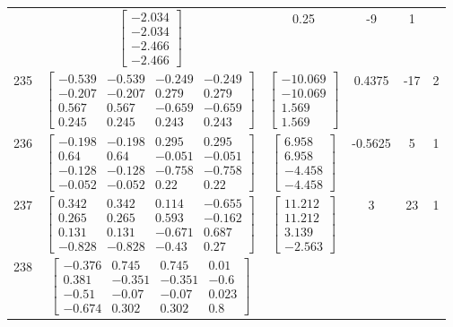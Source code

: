\documentclass[a4paper,12pt]{article}
\begin{document}
\begin{tabular}{c c c c c c}
&
$\begin{bmatrix} -2.034 \\ -2.034 \\ -2.466 \\ -2.466 \end{bmatrix}$
&
0.25
&
-9
&
1
\\
235
&
$\begin{bmatrix} -0.539 & -0.539 & -0.249 & -0.249 \\ -0.207 & -0.207 & 0.279 & 0.279 \\ 0.567 & 0.567 & -0.659 & -0.659 \\ 0.245 & 0.245 & 0.243 & 0.243 \end{bmatrix}$
&
$\begin{bmatrix} -10.069 \\ -10.069 \\ 1.569 \\ 1.569 \end{bmatrix}$
&
0.4375
&
-17
&
2
\\
236
&
$\begin{bmatrix} -0.198 & -0.198 & 0.295 & 0.295 \\ 0.64 & 0.64 & -0.051 & -0.051 \\ -0.128 & -0.128 & -0.758 & -0.758 \\ -0.052 & -0.052 & 0.22 & 0.22 \end{bmatrix}$
&
$\begin{bmatrix} 6.958 \\ 6.958 \\ -4.458 \\ -4.458 \end{bmatrix}$
&
-0.5625
&
5
&
1
\\
237
&
$\begin{bmatrix} 0.342 & 0.342 & 0.114 & -0.655 \\ 0.265 & 0.265 & 0.593 & -0.162 \\ 0.131 & 0.131 & -0.671 & 0.687 \\ -0.828 & -0.828 & -0.43 & 0.27 \end{bmatrix}$
&
$\begin{bmatrix} 11.212 \\ 11.212 \\ 3.139 \\ -2.563 \end{bmatrix}$
&
3
&
23
&
1
\\
238
&
$\begin{bmatrix} -0.376 & 0.745 & 0.745 & 0.01 \\ 0.381 & -0.351 & -0.351 & -0.6 \\ -0.51 & -0.07 & -0.07 & 0.023 \\ -0.674 & 0.302 & 0.302 & 0.8 \end{bmatrix}$

\end{tabular}
\end{document}
